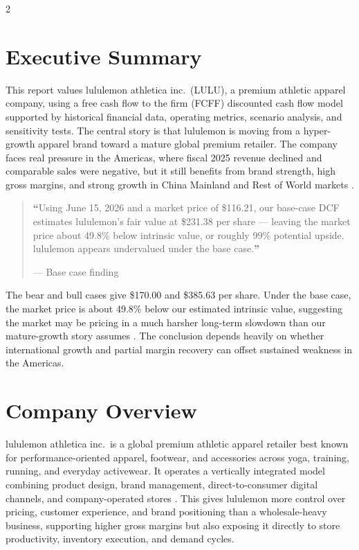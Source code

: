 \documentclass[a4paper]{CSMakotoTechnicalReport}
\begin{document}
\begin{multicols}{2}

\tableofcontents

\section{Executive Summary}

This report values lululemon athletica inc.\ (LULU), a premium athletic apparel company, using a free cash flow to the firm (FCFF) discounted cash flow model supported by historical financial data, operating metrics, scenario analysis, and sensitivity tests. The central story is that lululemon is moving from a hyper-growth apparel brand toward a mature global premium retailer. The company faces real pressure in the Americas, where fiscal 2025 revenue declined and comparable sales were negative, but it still benefits from brand strength, high gross margins, and strong growth in China Mainland and Rest of World markets \autocite{lulu10k,lulu10q}.

\begin{quote}
\textbf{\LARGE ``}Using June 15, 2026 and a market price of \$116.21, our base-case DCF estimates lululemon's fair value at \$231.38 per share --- leaving the market price about 49.8\% below intrinsic value, or roughly 99\% potential upside. lululemon appears undervalued under the base case.\textbf{''}

\hfill--- Base case finding
\end{quote}

The bear and bull cases give \$170.00 and \$385.63 per share. Under the base case, the market price is about 49.8\% below our estimated intrinsic value, suggesting the market may be pricing in a much harsher long-term slowdown than our mature-growth story assumes \autocite{marketwatch2026}. The conclusion depends heavily on whether international growth and partial margin recovery can offset sustained weakness in the Americas.

\section{Company Overview}

lululemon athletica inc.\ is a global premium athletic apparel retailer best known for performance-oriented apparel, footwear, and accessories across yoga, training, running, and everyday activewear. It operates a vertically integrated model combining product design, brand management, direct-to-consumer digital channels, and company-operated stores \autocite{lulu10k}. This gives lululemon more control over pricing, customer experience, and brand positioning than a wholesale-heavy business, supporting higher gross margins but also exposing it directly to store productivity, inventory execution, and demand cycles.


\end{multicols}
\end{document}
